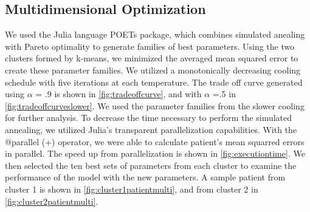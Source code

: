 \documentclass[fleqn,10pt]{wlscirep}
\begin{document}
\subsection*{Multidimensional Optimization}
We used the Julia language POETs package, which combines simulated anealing with Pareto optimality to generate families of best parameters.\cite{bassen2016jupoets} Using the two clusters formed by k-means, we minimized the averaged mean squared error to create these parameter families. We utilized a monotonically decreasing cooling schedule with five iterations at each temperature. The trade off curve generated using $\alpha$ = .9 is shown in \ref{fig:tradeoffcurve}, and with $\alpha$ =.5  in \ref{fig:tradeoffcurveslower}. We used the parameter families from the slower cooling for further analysis. 
To decrease the time necessary to perform the simulated annealing, we utilized Julia's transparent parallelization capabilities. With the @parallel (+) operator, we were able to calculate patient's mean squarred errors in parallel. The speed up from parallelization is shown in \ref{fig:executiontime}. 
We then selected the ten best sets of parameters from each cluster to examine the performance of the model with the new parameters. A sample patient from cluster 1 is shown in \ref{fig:cluster1patientmulti}, and from cluster 2 in \ref{fig:cluster2patientmulti}. 
 
\end{document}
